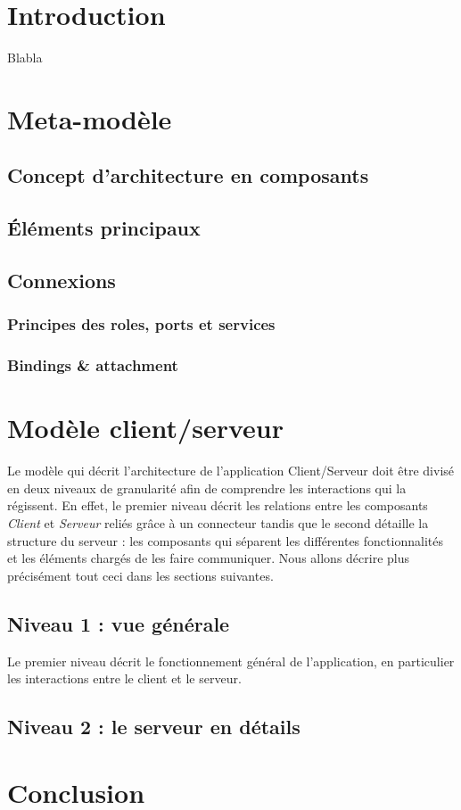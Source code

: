 \chapter*{Introduction}
	Blabla


\chapter{Meta-modèle}
	\section{Concept d'architecture en composants}
		
	
	
	\section{Éléments principaux}
		
	
	\section{Connexions}
		\subsection{Principes des roles, ports et services}
			
		\subsection{Bindings \& attachment}
			

\chapter{Modèle client/serveur}
		Le modèle qui décrit l'architecture de l'application Client/Serveur doit être divisé en deux niveaux de granularité afin de comprendre les interactions qui la régissent. En effet, le premier niveau décrit les relations entre les composants \textit{Client} et \textit{Serveur} reliés grâce à un connecteur tandis que le second détaille la structure du serveur : les composants qui séparent les différentes fonctionnalités et les éléments chargés de les faire communiquer. Nous allons décrire plus précisément tout ceci dans les sections suivantes.
		
	\section{Niveau 1 : vue générale}
		Le premier niveau décrit le fonctionnement général de l'application, en particulier les interactions entre le client et le serveur. 
	\section{Niveau 2 : le serveur en détails}


\chapter*{Conclusion}
	
